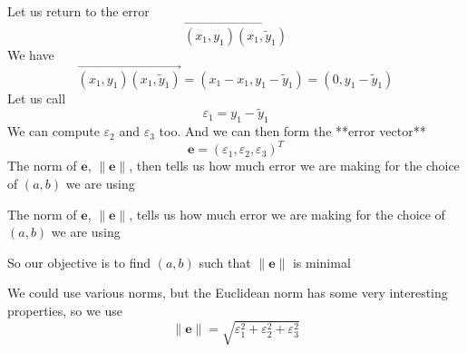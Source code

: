 \documentclass[aspectratio=169]{beamer}\usepackage[]{graphicx}\usepackage[]{xcolor}
\makeatletter
\newcommand{\hlnum}[1]{\textcolor[rgb]{0.686,0.059,0.569}{#1}}%
\newcommand{\hlsng}[1]{\textcolor[rgb]{0.192,0.494,0.8}{#1}}%
\newcommand{\hlcom}[1]{\textcolor[rgb]{0.678,0.584,0.686}{\textit{#1}}}%
\newcommand{\hlopt}[1]{\textcolor[rgb]{0,0,0}{#1}}%
\newcommand{\hldef}[1]{\textcolor[rgb]{0.345,0.345,0.345}{#1}}%
\newcommand{\hlkwb}[1]{\textcolor[rgb]{0.69,0.353,0.396}{#1}}%
\newcommand{\hlkwc}[1]{\textcolor[rgb]{0.333,0.667,0.333}{#1}}%
\newcommand{\hlkwd}[1]{\textcolor[rgb]{0.737,0.353,0.396}{\textbf{#1}}}%
\newenvironment{kframe}{%
 \def\at@end@of@kframe{}%
 \ifinner\ifhmode%
  \def\at@end@of@kframe{\end{minipage}}%
  \begin{minipage}{\columnwidth}%
 \fi\fi%
 \def\FrameCommand##1{\hskip\@totalleftmargin \hskip-\fboxsep
 \colorbox{shadecolor}{##1}\hskip-\fboxsep
     \hskip-\linewidth \hskip-\@totalleftmargin \hskip\columnwidth}%
 \MakeFramed {\advance\hsize-\width
   \@totalleftmargin\z@ \linewidth\hsize
   \@setminipage}}%
 {\par\unskip\endMakeFramed%
 \at@end@of@kframe}
\newenvironment{knitrout}{}{} %
\makeatother
\begin{document}

\begin{frame}
Let us return to the error
$$
\overrightarrow{(x_1,y_1)(x_1,\tilde y_1)}
$$
We have
$$
\overrightarrow{(x_1,y_1)(x_1,\tilde y_1)}
= (x_1-x_1,y_1-\tilde y_1)
= (0, y_1-\tilde y_1)
$$
Let us call
$$
\varepsilon_1 = y_1-\tilde y_1
$$
We can compute $\varepsilon_2$ and $\varepsilon_3$ too. And we can then form the **error vector**
$$
\mathbf{e} = (\varepsilon_1,\varepsilon_2,\varepsilon_3)^T
$$
The norm of $\mathbf{e}$, $\|\mathbf{e}\|$, then tells us how much error we are making for the choice of $(a,b)$ we are using
\end{frame}


\begin{frame}
The norm of $\mathbf{e}$, $\|\mathbf{e}\|$, tells us how much error we are making for the choice of $(a,b)$ we are using

So our objective is to find $(a,b)$ such that $\|\mathbf{e}\|$ is minimal

We could use various norms, but the Euclidean norm has some very interesting properties, so we use
$$
\|\mathbf{e}\| = \sqrt{\varepsilon_1^2+\varepsilon_2^2+\varepsilon_3^2}
$$
\end{frame}
\end{document}
